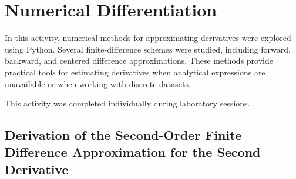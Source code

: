 \documentclass[../portafolio.tex]{subfiles}
\begin{document}
\section{Numerical Differentiation}  


\medskip


In this activity, numerical methods for approximating derivatives were explored using Python. Several finite-difference schemes were studied, including forward, backward, and centered difference approximations. These methods provide practical tools for estimating derivatives when analytical expressions are unavailable or when working with discrete datasets.


This activity was completed individually during laboratory sessions.


\subsection{Derivation of the Second-Order Finite Difference Approximation for the Second Derivative}
\end{document}
